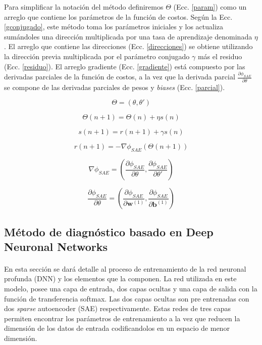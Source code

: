 \documentclass[12pt]{article}%
\begin{document}
Para simplificar la notación del método definiremos $\Theta$ (Ecc. \ref{param}) como un arreglo que contiene los parámetros de la función de costos. Según la Ecc. \ref{gconjugado}, este método toma los parámetros iniciales y los actualiza sumándoles una dirección multiplicada por una tasa de aprendizaje denominada $\eta$. El arreglo que contiene las direcciones (Ecc. \ref{direcciones}) se obtiene utilizando la dirección previa multiplicada por el parámetro conjugado $\gamma$ más el residuo (Ecc. \ref{residuo}). El arreglo gradiente (Ecc. \ref{gradiente}) está compuesto por las derivadas parciales de la función de costos, a la vez que la derivada parcial $\frac{\partial{\phi_{SAE}}}{\partial{\theta}}$ se compone de las derivadas parciales de pesos y \textit{biases} (Ecc. \ref{parcial}).

\begin{equation}
\label{param}
\Theta = (\theta,\theta')
\end{equation} 

\begin{equation}
\label{gconjugado}
\Theta(n+1)=\Theta(n)+{\eta}s(n)
\end{equation}

\begin{equation}
\label{direcciones}
s(n+1)=r(n+1)+\gamma{s(n)}
\end{equation} 

\begin{equation}
\label{residuo}
r(n+1) = -\nabla{\phi_{SAE}(\Theta(n+1))}
\end{equation} 

\begin{equation}
\label{gradiente}
\nabla{\phi_{SAE}} = \left(\frac{\partial{\phi_{SAE}}}{\partial{\theta}},\frac{\partial{\phi_{SAE}}}{\partial{\theta'}}\right)
\end{equation}

\begin{equation}
\label{parcial}
\frac{\partial{\phi_{SAE}}}{\partial{\theta}} = \left(\frac{\partial{\phi_{SAE}}}{\partial{\textbf{w}^{(1)}}},\frac{\partial{\phi_{SAE}}}{\partial{\textbf{b}^{(1)}}}\right)
\end{equation}  
\subsection{Método de diagnóstico basado en Deep Neuronal Networks}
\label{sec:training}

\paragraph{}
En esta sección se dará detalle al proceso de entrenamiento de la red neuronal profunda (DNN) y los elementos que la componen. La red utilizada en este modelo, posee una capa de entrada, dos capas ocultas y una capa de salida con la función de transferencia softmax. Las dos capas ocultas son pre entrenadas con dos \textit{sparse} autoencoder (SAE) respectivamente. Estas redes de tres capas permiten encontrar los parámetros de entrenamiento a la vez que reducen la dimensión de los datos de entrada codificandolos en un espacio de menor dimensión. 
\end{document}
